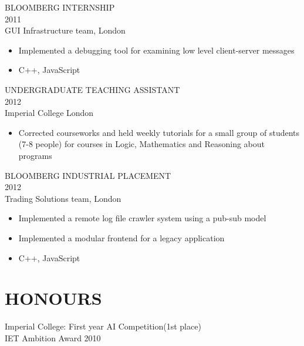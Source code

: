 \documentclass[11pt]{res} %
\begin{document}
\begin{resume}
BLOOMBERG INTERNSHIP\\
2011\\
GUI Infrastructure team, London
\vspace{0.2in}
 \begin{itemize} \itemsep -2pt
 \item Implemented a debugging tool for examining low level client-server messages
 \item C++, JavaScript
\end{itemize} 

UNDERGRADUATE TEACHING ASSISTANT\\
2012\\
Imperial College London
\vspace{0.2in}
 \begin{itemize} \itemsep -2pt
 \item Corrected courseworks and held weekly tutorials for a small group of students (7-8 people) for courses in Logic, Mathematics and Reasoning about programs
\end{itemize}
BLOOMBERG INDUSTRIAL PLACEMENT\\
2012\\
Trading Solutions team, London
\vspace{0.2in}
 \begin{itemize} \itemsep -2pt
 \item Implemented a remote log file crawler system using a pub-sub model
 \item Implemented a modular frontend for a legacy application
 \item C++, JavaScript
\end{itemize} 

\section{HONOURS} 
 
Imperial College: First year AI Competition(1st place)\\
IET Ambition Award 2010


\end{resume}
\end{document}
